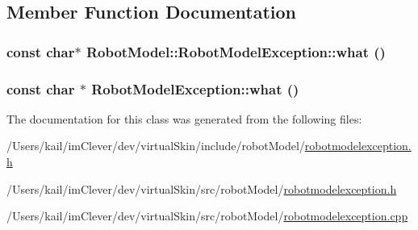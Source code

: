 \subsection{Member Function Documentation}
\hypertarget{class_robot_model_1_1_robot_model_exception_a1a9e091d897bf368a812f2d1dbd96382}{
\subsubsection[{what}]{\setlength{\rightskip}{0pt plus 5cm}const char$\ast$ RobotModel::RobotModelException::what ()}}
\label{class_robot_model_1_1_robot_model_exception_a1a9e091d897bf368a812f2d1dbd96382}
\hypertarget{class_robot_model_1_1_robot_model_exception_a96661f7c3b0cbb9c815b23c1eb315912}{
\subsubsection[{what}]{\setlength{\rightskip}{0pt plus 5cm}const char $\ast$ RobotModelException::what ()}}
\label{class_robot_model_1_1_robot_model_exception_a96661f7c3b0cbb9c815b23c1eb315912}


The documentation for this class was generated from the following files:\begin{DoxyCompactItemize}
\item 
/Users/kail/imClever/dev/virtualSkin/include/robotModel/\hyperlink{include_2robot_model_2robotmodelexception_8h}{robotmodelexception.h}\item 
/Users/kail/imClever/dev/virtualSkin/src/robotModel/\hyperlink{src_2robot_model_2robotmodelexception_8h}{robotmodelexception.h}\item 
/Users/kail/imClever/dev/virtualSkin/src/robotModel/\hyperlink{robotmodelexception_8cpp}{robotmodelexception.cpp}\end{DoxyCompactItemize}
